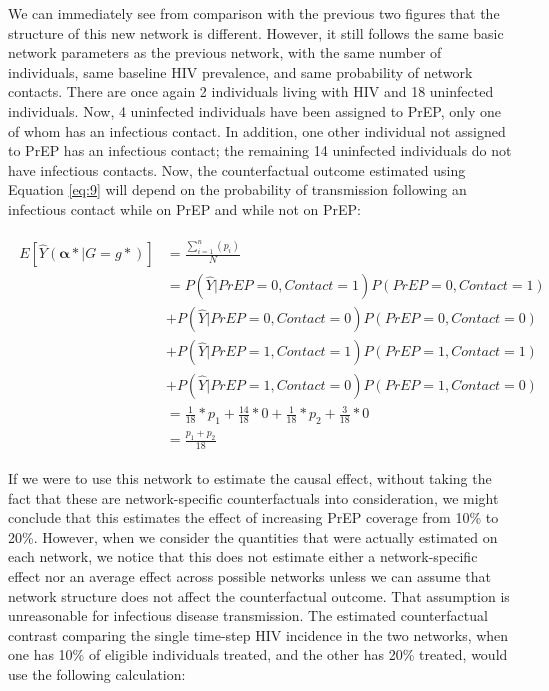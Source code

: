 \documentclass{article}
\theoremstyle{definition}
\begin{document}
We can immediately see from comparison with the previous two figures that the structure of this new network is different. However, it still follows the same basic network parameters as the previous network, with the same number of individuals, same baseline HIV prevalence, and same probability of network contacts. There are once again 2 individuals living with HIV and 18 uninfected individuals. Now, 4 uninfected individuals have been assigned to PrEP, only one of whom has an infectious contact. In addition, one other individual not assigned to PrEP has an infectious contact; the remaining 14 uninfected individuals do not have infectious contacts. Now, the counterfactual outcome estimated using Equation \ref{eq:9} will depend on the probability of transmission following an infectious contact while on PrEP and while not on PrEP:

\begin{align}
\begin{split}
E[\hat{Y}\left(\mathbf{\alpha*}|G=g*\right)] & = \frac{\sum_{i=1}^{n}(p_{i})}{N}  \\ 
& = P\left(\hat{Y}|PrEP = 0, Contact = 1\right)P\left(PrEP = 0, Contact = 1\right)  \\ \nonumber
& +P\left(\hat{Y}|PrEP = 0, Contact = 0\right)P\left(PrEP = 0, Contact = 0\right)  \\ \nonumber
& +P\left(\hat{Y}|PrEP = 1, Contact = 1\right)P\left(PrEP = 1, Contact = 1\right) \\ \nonumber
& +P\left(\hat{Y}|PrEP = 1, Contact = 0\right)P\left(PrEP = 1, Contact = 0\right) \\ \nonumber
 &= \frac{1}{18}*p_1 +  \frac{14}{18}*0 +\frac{1}{18}*p_2 +  \frac{3}{18}*0 \\ \nonumber
 &=\frac{p_1+p_2}{18}  \nonumber
 \end{split}
\end{align}

If we were to use this network to estimate the causal effect, without taking the fact that these are network-specific counterfactuals into consideration, we might conclude that this estimates the effect of increasing PrEP coverage from 10\% to 20\%. However, when we consider the quantities that were actually estimated on each network, we notice that this does not estimate either a network-specific effect nor an average effect across possible networks unless we can assume that network structure does not affect the counterfactual outcome. That assumption is unreasonable for infectious disease transmission. The estimated counterfactual contrast comparing the single time-step HIV incidence in the two networks, when one has 10\% of eligible individuals treated, and the other has 20\% treated, would use the following calculation: 
\end{document}
